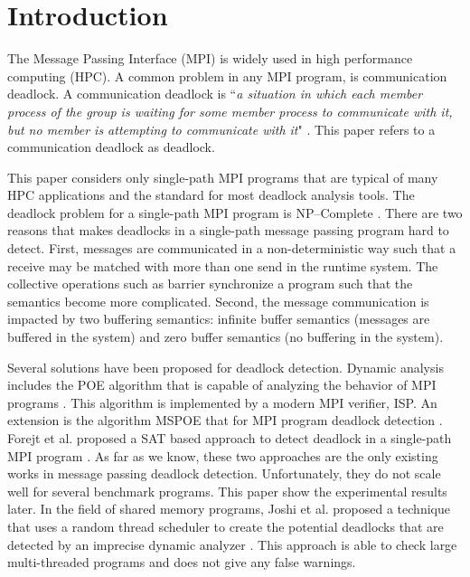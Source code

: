 \section{Introduction}
The Message Passing Interface (MPI) is widely used in high performance computing (HPC). A common problem in any MPI program, is communication deadlock. A communication deadlock is ``\emph{a situation in which each member process of the group is waiting for some member process to communicate with it, but no member is attempting to communicate with it}" \cite{DBLP:conf/fsttcs/Natarajan84}. This paper refers to a communication deadlock as deadlock. 

This paper considers only single-path MPI programs that are typical of many HPC applications and the standard for most deadlock analysis tools. The deadlock problem for a single-path MPI program is NP--Complete \cite{DBLP:conf/fm/ForejtKNS14}. There are two reasons that makes deadlocks in a single-path message passing program hard to detect. First, messages are communicated in a non-deterministic way such that a receive may be matched with more than one send in the runtime system. The collective operations such as barrier synchronize a program such that the semantics become more complicated. Second, the message communication is impacted by two buffering semantics: infinite buffer semantics (messages are buffered in the system) and zero buffer semantics (no buffering in the system). 

Several solutions have been proposed for deadlock detection. Dynamic analysis includes the POE algorithm that is capable of analyzing the behavior of MPI programs \cite{DBLP:conf/ppopp/VakkalankaSGK08}. This algorithm is implemented by a modern MPI verifier, ISP. An extension is the algorithm MSPOE that for MPI program deadlock detection \cite{DBLP:conf/sbmf/SharmaGB12}. 
Forejt et al. proposed a SAT based approach to detect deadlock in a single-path MPI program \cite{DBLP:conf/fm/ForejtKNS14}. As far as we know, these two approaches are the only existing works in message passing deadlock detection. Unfortunately, they do not scale well for several benchmark programs. This paper show the experimental results later. In the field of shared memory programs, Joshi et al. proposed a technique that uses a random thread scheduler to create the potential deadlocks that are detected by an imprecise dynamic analyzer \cite{DBLP:conf/pldi/JoshiPSN09}. This approach is able to check large multi-threaded programs and does not give any false warnings. 

